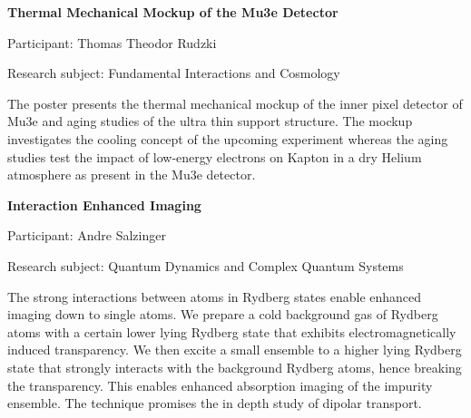 \begin{minipage}[t]{1.0\textwidth}

\begin{center}

{{\large\bfseries Thermal Mechanical Mockup of the Mu3e Detector}\par}

\end{center}

{\noindent Participant: Thomas Theodor Rudzki\par} 

{\noindent Research subject: Fundamental Interactions and Cosmology\par}\medskip

\noindent The poster presents the thermal mechanical mockup of the inner pixel detector of Mu3e and aging studies of the ultra thin support structure. The mockup investigates the cooling concept of the upcoming experiment whereas the aging studies test the impact of low-energy electrons on Kapton in a dry Helium atmosphere as present in the Mu3e detector.\par\end{minipage}

\hfill 
 

\begin{minipage}[t]{1.0\textwidth}

\begin{center}

{{\large\bfseries Interaction Enhanced Imaging}\par}

\end{center}

{\noindent Participant: Andre Salzinger\par} 

{\noindent Research subject: Quantum Dynamics and Complex Quantum Systems\par}\medskip

\noindent The strong interactions between atoms in Rydberg states enable enhanced imaging down to single atoms. We prepare a cold background gas of Rydberg atoms with a certain lower lying Rydberg state that exhibits electromagnetically induced transparency. We then excite a small ensemble to a higher lying Rydberg state that strongly interacts with the background Rydberg atoms, hence breaking the transparency. This enables enhanced absorption imaging of the impurity ensemble. The technique promises the in depth study of dipolar transport.\par\end{minipage}

